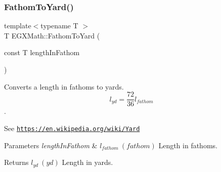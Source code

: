 \subsubsection{\texorpdfstring{Fathom\+To\+Yard()}{FathomToYard()}}
{\footnotesize\ttfamily template$<$typename T $>$ \\
T E\+G\+X\+Math\+::\+Fathom\+To\+Yard (\begin{DoxyParamCaption}\item[{const T}]{length\+In\+Fathom }\end{DoxyParamCaption})}



Converts a length in fathoms to yards. \[ l_{yd}= \frac{72}{36} l_{fathom} \]. 

See \href{https://en.wikipedia.org/wiki/Yard}{\tt https\+://en.\+wikipedia.\+org/wiki/\+Yard} 
\begin{DoxyParams}{Parameters}
{\em length\+In\+Fathom} & $ l_{fathom}\ (fathom)$ Length in fathoms. \\
\hline
\end{DoxyParams}
\begin{DoxyReturn}{Returns}
$ l_{yd}\ (yd)$ Length in yards. 
\end{DoxyReturn}
